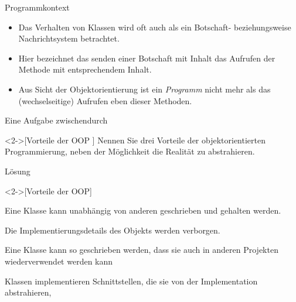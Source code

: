 \begin{frame}{Programmkontext}
    \begin{itemize}[<+(1)->]
        \widei
        \item Das Verhalten von Klassen wird oft auch als ein Botschaft- beziehungsweise Nachrichtsystem betrachtet.
        \item Hier bezeichnet das senden einer Botschaft mit Inhalt das Aufrufen der Methode mit entsprechendem Inhalt.
        \item Aus Sicht der Objektorientierung ist ein \emph{Programm}\pause{} nicht mehr als das (wechselseitige) Aufrufen eben dieser Methoden.
    \end{itemize}
\end{frame}

\ifull
\begin{frame}[c]{Eine Aufgabe zwischendurch}
    \begin{exercise}<2->[Vorteile der OOP ]
        Nennen Sie drei Vorteile der objektorientierten Programmierung, neben der Möglichkeit die Realität zu abstrahieren.
    \end{exercise}
\end{frame}

\begin{frame}[c]{Lösung}
    \begin{solve}<2->[Vorteile der OOP]
        \begin{description}[XY]
            \item<4->[Modularität] Eine Klasse kann unabhängig von anderen geschrieben und gehalten werden.
            \item<5->[Informationsverdeckung] Die Implementierungsdetails des Objekts werden verborgen.
            \item<6->[Wiederverwendbarkeit] Eine Klasse kann so geschrieben werden, dass sie auch in anderen Projekten wiederverwendet werden kann 
            \item<8->[Komposition/Polymorphie] Klassen implementieren Schnittstellen, die sie von der Implementation abstrahieren, 
        \end{description}
    \end{solve}
\end{frame}
\fi

